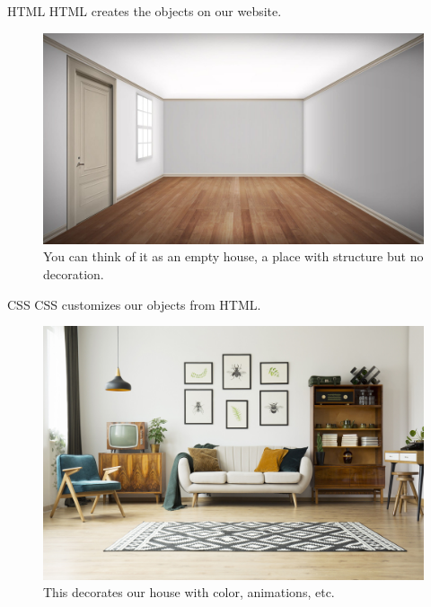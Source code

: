 \documentclass[aspectratio=169,xcolor=dvipsnames]{beamer}
\begin{document}
\begin{frame}{HTML}
  HTML creates the objects on our website.
  \centering
  \begin{figure}
    \includegraphics[scale=0.12]{emptyHouse.jpg}
    \caption*{\small You can think of it as an empty house, a place with structure but no decoration.}
  \end{figure}
\end{frame}

\begin{frame}{CSS}
  CSS customizes our objects from HTML.
  \centering
  \begin{figure}
    \includegraphics[scale=0.04]{decoratedHouse.jpg}
    \caption*{This decorates our house with color, animations, etc.}
  \end{figure}
\end{frame}
\end{document}
